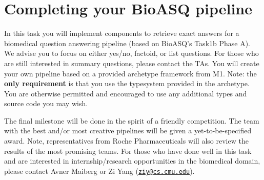 
%
\chapter{Completing your BioASQ pipeline}
\vspace{-1cm}
In this task you will implement components to retrieve exact answers for a biomedical question answering pipeline (based on BioASQ's Task1b Phase A). We advise you to focus on either yes/no, factoid, or list questions. For those who are still interested in summary questions, please contact the TAs. You will create your own pipeline based on a provided archetype framework from M1. Note: the \textbf{only requirement} is that you use the typesystem provided in the archetype. You are otherwise permitted and encouraged to use any additional types and source code you may wish.

The final milestone will be done in the spirit of a friendly competition. The team with the best and/or most creative pipelines will be given a yet-to-be-specified award. Note, representatives from Roche Pharmaceuticals will also review the results of the most promising teams. For those who have done well in this task and are interested in internship/research opportunities in the biomedical domain, please contact Avner Maiberg or Zi Yang (\href{mailto:ziy@cs.cmu.edu}{\nolinkurl{ziy@cs.cmu.edu}}).  


%

